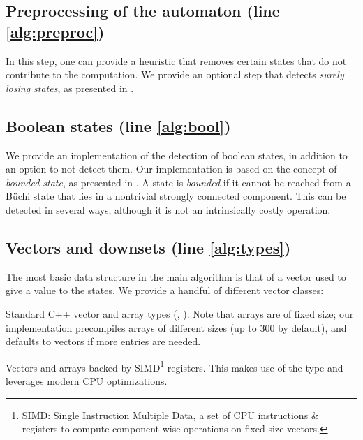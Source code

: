 \documentclass[runningheads,a4paper]{llncs}
\begin{document}
\subsection{Preprocessing of the automaton (line \ref{alg:preproc})}\label{sec:preproc}

In this step, one can provide a heuristic that removes certain states that
do not contribute to the computation.  We provide an optional step that
detects \emph{surely losing states}, as presented in \cite{ggs14}.

\subsection{Boolean states (line \ref{alg:bool})}\label{sec:implem-bool}

We provide an implementation of the detection of boolean states, in addition to
an option to not detect them.  Our implementation is based on the concept of
\emph{bounded state}, as presented in \cite{bohy14}.  A state is \emph{bounded}
if it cannot be reached from a Büchi state that lies in a nontrivial strongly
connected component.  This can be detected in several ways, although it is not
an intrinsically costly operation.

\subsection{Vectors and downsets (line \ref{alg:types})}\label{sec:vecds}

The most basic data structure in the main algorithm is that of a vector used to
give a value to the states.  We provide a handful of different vector
classes:
\begin{compactitem}
\item Standard C++ vector and array types (,\linebreak
  ).  Note that arrays are of fixed size; our implementation
  precompiles arrays of different sizes (up to \(300\) by default),
  and defaults to vectors if more entries are needed.
\item Vectors and arrays backed by SIMD\footnote{SIMD: Single Instruction
  Multiple Data, a set of CPU instructions \& registers to compute
  component-wise operations on fixed-size vectors.} registers.  This makes use of the
  type  and leverages modern CPU
  optimizations.
\end{compactitem}
\end{document}
